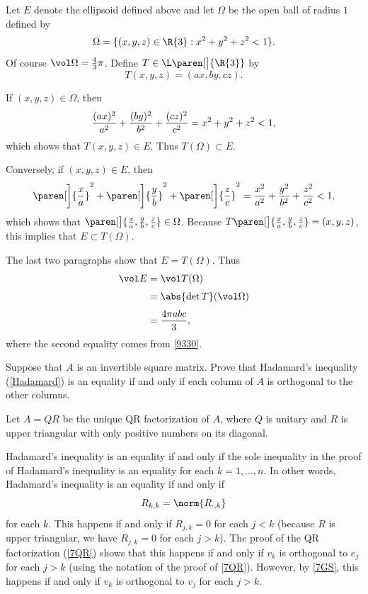 \begin{Solution}
Let $E$ denote the ellipsoid defined above and let $\Omega$ be the open ball of radius
$1$ defined by
\[
\Omega = \{(x, y, z) \in \R{3}: x^2 + y^2 + z^2 < 1 \}.
\]
Of course $\vol \Omega = \frac{4}{3}\pi$.  Define $T \in \L\paren[\big]{\R{3}}$ by
\[
T(x, y, z) = (ax, by, cz).
\]

If $(x, y, z) \in \Omega$, then
\[
\frac{(ax)^2}{a^2} + \frac{(by)^2}{b^2} + \frac{(cz)^2}{c^2}
= x^2 + y^2 + z^2 \\[3bp]
< 1,
\]
which shows that $T(x, y, z) \in E$.  Thus $T(\Omega) \subset E$.

Conversely, if $(x, y, z) \in E$, then
\[
\paren[\bigg]{\frac{x}{a}}^2 + \paren[\bigg]{\frac{y}{b}}^2 +
\paren[\bigg]{\frac{z}{c }}^2
=  \frac{x^2}{a^2} + \frac{y^2}{b^2} + \frac{z^2}{c^2} \\[3bp]
 < 1,
\]
which shows that $\paren[\big]{\frac{x}{a}, \frac{y}{b}, \frac{z}{c}} \in \Omega$.  Because
$T\paren[\big]{\frac{x}{a}, \frac{y}{b}, \frac{z}{c}} = (x, y, z)$, this implies that
$E \subset T(\Omega)$.

The last two paragraphs show that $E = T(\Omega)$.  Thus
\begin{align*}
\vol E &= \vol T(\Omega) \\[3bp]
&= \abs{\det T} (\vol \Omega) \\[3bp]
&= \frac{4\pi abc}{3},
\end{align*}
where the second equality comes from \ref{9330}.
\end{Solution}

\exercise
Suppose that $A$ is an invertible square matrix. Prove that Hadamard's \mbox{inequality} (\ref{Hadamard}) is an equality if and only if each column of $A$ is orthogonal to the other columns.\label{7HadEq}

\begin{Solution}
Let $A = QR$ be the unique QR factorization of $A$, where $Q$ is unitary and $R$ is upper triangular with only positive numbers on its diagonal.

Hadamard's inequality is an equality if and only if the sole inequality in the proof of Hadamard's inequality is an equality for each
$k = 1, \ldots, n$. In other words, Hadamard's inequality is an equality if and only if
\[
R_{k,k} = \norm{ R_{\cdot, k} }
\]
for each $k$. This happens if and only if $R_{j,k} = 0$ for each $j < k$ (because $R$ is upper triangular, we have $R_{j,k} = 0$ for each
$j > k$). The proof of the QR factorization (\ref{7QR}) shows that this happens if and only if $v_k$ is orthogonal to $e_j$ for each
$j > k$ (using the notation of the proof of \ref{7QR}). However, by \ref{7GS}, this happens if and only if $v_k$ is orthogonal to $v_j$ for each
$j > k$.
\end{Solution}

